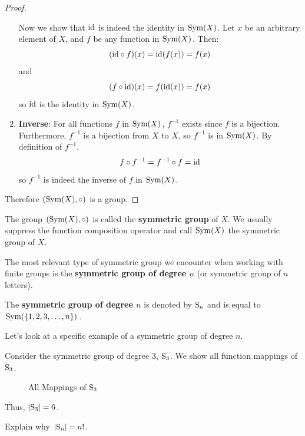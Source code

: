 \begin{proof}
\begin{enumerate}
\begin{itemize}
        \end{itemize}
        Now we show that $\mathrm{id}$ is indeed the identity in $\mathrm{Sym}(X)$. Let $x$ be an arbitrary element of $X$, and $f$ be any function in $\mathrm{Sym}(X)$. Then:
        \[
            (\mathrm{id} \circ f)(x) = \mathrm{id}(f(x)) = f(x)
        \]
        and
        \[
            (f \circ \mathrm{id})(x) = f(\mathrm{id}(x)) = f(x)
        \]
        so $\mathrm{id}$ is the identity in $\mathrm{Sym}(X)$.
        \item \textbf{Inverse}: For all functions $f$ in $\mathrm{Sym}(X)$, $f^{-1}$ exists since $f$ is a bijection. Furthermore, $f^{-1}$ is a bijection from $X$ to $X$, so $f^{-1}$ is in $\mathrm{Sym}(X)$. By definition of $f^{-1}$,
        \[
            f \circ f^{-1} = f^{-1} \circ f = \mathrm{id}
        \]
        so $f^{-1}$ is indeed the inverse of $f$ in $\mathrm{Sym}(X)$.
    \end{enumerate}
    Therefore $(\mathrm{Sym}(X), \circ)$ is a group.
\end{proof}
The group $(\mathrm{Sym}(X), \circ)$ is called the \textbf{symmetric group} of $X$. We usually suppress the function composition operator and call $\mathrm{Sym}(X)$ the symmetric group of $X$.

The most relevant type of symmetric group we encounter when working with finite groups is the \textbf{symmetric group of degree $n$} (or symmetric group of $n$ letters).
\begin{definition}
    The \textbf{symmetric group of degree $n$} is denoted by $\mathrm{S}_{n}$ and is equal to $\mathrm{Sym}(\{1, 2, 3, \dots, n\})$.
\end{definition}

Let's look at a specific example of a symmetric group of degree $n$.
\begin{example}\label{example-symmetric-group-of-degree-3}
    Consider the symmetric group of degree 3, $\mathrm{S}_{3}$. We show all function mappings of $\mathrm{S}_{3}$.

    \begin{figure}[h]
        \centering
        \caption{All Mappings of $\mathrm{S}_{3}$}
    \end{figure}

    Thus, $|\mathrm{S}_{3}| = 6$.
\end{example}
\begin{exercise}\label{exercise-order-of-Sn}
    Explain why $|\mathrm{S}_{n}| = n!$.
\end{exercise}

